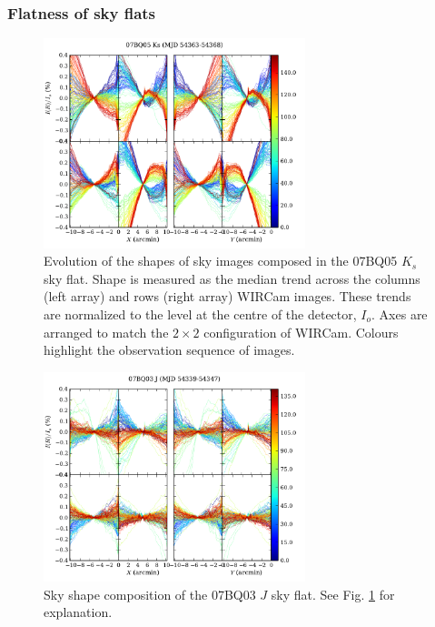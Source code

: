 \documentclass[iop]{emulateapj}
\begin{document}
\subsubsection{Flatness of sky flats}
\label{sec:skyflatshapes}

\begin{figure}[t]
    \centering
        \includegraphics[width=3in]{figs/07BQ05_Ks.pdf}
    \caption{Evolution of the shapes of sky images composed in the 07BQ05 $K_s$ sky flat. Shape is measured as the median trend across the columns (left array) and rows (right array) WIRCam images. These trends are normalized to the level at the centre of the detector, $I_o$. Axes are arranged to match the $2 \times 2$ configuration of WIRCam. Colours highlight the observation sequence of images.}
    \label{fig:flat_07BQ05_Ks}
\end{figure}


\begin{figure}[t]
   \centering
       \includegraphics[width=3in]{figs/07BQ03_J.pdf}
   \caption[Sky shape composition of the 07BQ03 $J$ sky flat]{Sky shape composition of the 07BQ03 $J$ sky flat. See Fig. \ref{fig:flat_07BQ05_Ks} for explanation.}
   \label{fig:flat_07BQ03_J}
\end{figure}
\end{document}
